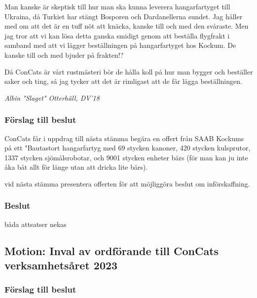 \documentclass[protokoll]{dvd}
\begin{document}
Man kanske är skeptisk till hur man ska kunna leverera hangarfartyget till Ukraina, då Turkiet har stängt Bosporen och Dardanellerna sundet.
Jag håller med om att det är en tuff nöt att knäcka, kanske till och med den svåraste.
Men jag tror att vi kan lösa detta ganska smidigt genom att beställa flygfrakt i samband med att vi lägger beställningen på hangarfartyget hos Kockum.
De kanske till och med bjuder på frakten!?

Då ConCats är vårt rustmästeri bör de hålla koll på hur man bygger och beställer saker och ting, så jag tycker att det är rimligast att de får lägga beställningen.

\emph{Albin "Slaget" Otterhäll, DV'18}

    \subsubsection*{Förslag till beslut}
        \begin{attsatser}
            \item ConCats får i uppdrag till nästa stämma begära en offert från SAAB Kockums på ett "Bautastort hangarfartyg med 69 stycken kanoner, 420 stycken kulsprutor, 1337 stycken sjömålsrobotar, och 9001 stycken enheter bärs (för man kan ju inte åka båt allt för länge utan att dricka lite bärs).
            \item vid nästa stämma presentera offerten för att möjliggöra beslut om införskaffning.
        \end{attsatser}

    \subsubsection*{Beslut}
        \begin{attsatser}
            \item båda attsatser nekas
        \end{attsatser}

\newpage

\subsection{Motion: Inval av ordförande till ConCats verksamhetsåret 2023}

    \subsubsection*{Förslag till beslut}
\end{document}
